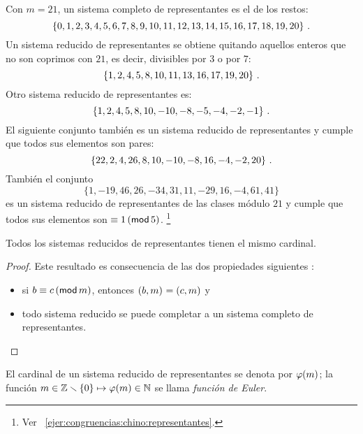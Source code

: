 \begin{ejemCongruencias}\label{ejem:congruencias:sistema-reducido:bis}
	Con $m=21$, un sistema completo de representantes es el de los
	restos:
	\begin{displaymath}
		\{0,1,2,3,4,5,6,7,8,9,10,11,12,13,14,15,16,17,18,19,20\}
		\dispstop
	\end{displaymath}
	Un sistema reducido de representantes se obtiene quitando aquellos
	enteros que no son coprimos con $21$, es decir, divisibles por $3$
	o por $7$:
	\begin{displaymath}
		\{1,2,4,5,8,10,11,13,16,17,19,20\}
		\dispstop
	\end{displaymath}
	Otro sistema reducido de representantes es:
	\begin{displaymath}
		\{1,2,4,5,8,10,-10,-8,-5,-4,-2,-1\}
		\dispstop
	\end{displaymath}
	El siguiente conjunto tambi\'en es un sistema reducido de
	representantes y cumple que todos sus elementos son pares:
	\begin{displaymath}
		\{22,2,4,26,8,10,-10,-8,16,-4,-2,20\}
		\dispstop
	\end{displaymath}
	Tambi\'en el conjunto
	\begin{displaymath}
		\{1,-19,46,26,-34,31,11,-29,16,-4,61,41\}
	\end{displaymath}
	es un sistema reducido de representantes de las clases m\'odulo $21$
	y cumple que todos sus elementos son $\equiv 1\tmodulo[5]$.%
	\footnote{
		Ver \ejername~\ref{ejer:congruencias:chino:representantes}.
	}
\end{ejemCongruencias}

\begin{teoCongruencias}\label{teo:congruencias:sistema-reducido}
	Todos los sistemas reducidos de representantes tienen el mismo
	cardinal.
\end{teoCongruencias}

\begin{proof}
	Este resultado es consecuencia de las dos propiedades siguientes
	\quedacomoejercicio:
	\begin{itemize}
		\item si $b\equiv c\tmodulo[m]$, entonces
			$\mcd{b,m}=\mcd{c,m}$ y
		\item todo sistema reducido se puede completar a un sistema
			completo de representantes.
	\end{itemize}
\end{proof}

\begin{defCongruencias}\label{def:congruencias:sistema-reducido:phi}
	El cardinal de un sistema reducido de representantes se denota por
	$\eulerphi(m)$; la funci\'on
	$m\in\Enteros\setmin\{0\}\mapsto\eulerphi(m)\in\Naturales$ se llama
	\emph{funci\'on de Euler}.
\end{defCongruencias}

